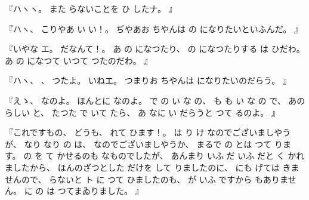 %
『ハヽヽ。
%
また
らないことを
ひ
したナ。
』

%
『ハヽ、
%
こりやあ
い
い！。
%
ぢやあお
ちやんは
の
になりたいといふんだ。
』

%
『いやな
エ。
%
だなんて！。
%
あ
の
になつたり、
%
の
になつたりする
は
ひだわ。
%
あ
の
になつて
いつて
つたのだわ。
』

%
『ハヽ、
%
、
%
つたよ。
%
いねエ。
%
つまりお
ちやんは
になりたいのだらう。
』

%
『えゝ、
%
なのよ。
%
ほんとに
なのよ。
%
で
の
い
な
の、
%
も
も
い
な
の
で、
%
あの
らしい
と、
%
たつた
で
いて
たら、
%
あ
なに
い
だらうと
つて
るのよ。
』

%
『これですもの、
%
どうも、
%
れて
ひます！。
%
は
り
け
なのでございましやうが、
%
なり
なり
の
は、
%
なのでございましやうか、
%
まるで
の
とは
つて
ります。
%
の
を
て
かせるのも
なものでしたが、
%
あんまり
いふ
だ
いふ
だと
く
かれましたから、
%
ほんのざつとした
だけを
して
りましたのに、
%
にも
げては
きませんので、
%
らないと
ト
に
つて
ひましたのも、
%
が
いふ
ですから
もありません。
%
に
の
は
つてまゐりました。
』

